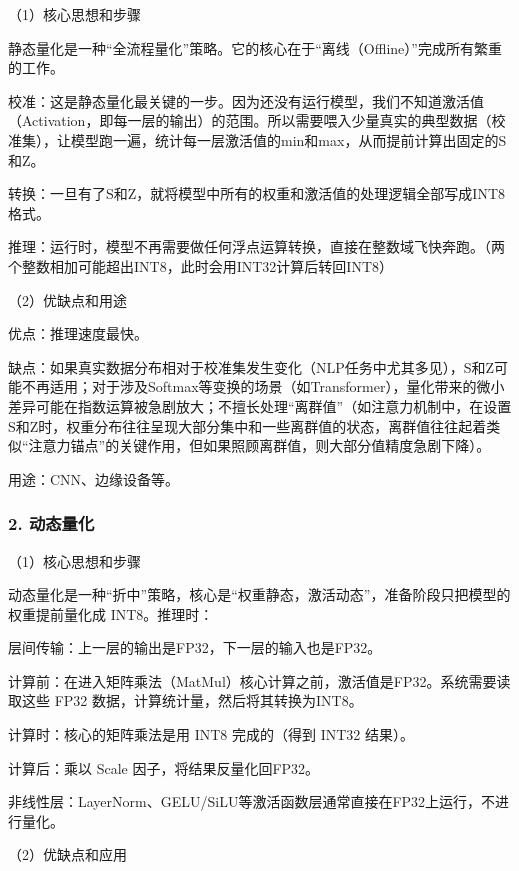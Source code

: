 （1）核心思想和步骤

静态量化是一种``全流程量化''策略。它的核心在于``离线（Offline）''完成所有繁重的工作。

校准：这是静态量化最关键的一步。因为还没有运行模型，我们不知道激活值（Activation，即每一层的输出）的范围。所以需要喂入少量真实的典型数据（校准集），让模型跑一遍，统计每一层激活值的min和max，从而提前计算出固定的S和Z。

转换：一旦有了S和Z，就将模型中所有的权重和激活值的处理逻辑全部写成INT8格式。

推理：运行时，模型不再需要做任何浮点运算转换，直接在整数域飞快奔跑。（两个整数相加可能超出INT8，此时会用INT32计算后转回INT8）

（2）优缺点和用途

优点：推理速度最快。

缺点：如果真实数据分布相对于校准集发生变化（NLP任务中尤其多见），S和Z可能不再适用；对于涉及Softmax等变换的场景（如Transformer），量化带来的微小差异可能在指数运算被急剧放大；不擅长处理``离群值''（如注意力机制中，在设置S和Z时，权重分布往往呈现大部分集中和一些离群值的状态，离群值往往起着类似``注意力锚点''的关键作用，但如果照顾离群值，则大部分值精度急剧下降）。

用途：CNN、边缘设备等。

\hypertarget{ux52a8ux6001ux91cfux5316}{%
\subsubsection{2. 动态量化}\label{ux52a8ux6001ux91cfux5316}}

（1）核心思想和步骤

动态量化是一种``折中''策略，核心是``权重静态，激活动态''，准备阶段只把模型的权重提前量化成 INT8。推理时：

层间传输：上一层的输出是FP32，下一层的输入也是FP32。

计算前：在进入矩阵乘法（MatMul）核心计算之前，激活值是FP32。系统需要读取这些 FP32 数据，计算统计量，然后将其转换为INT8。

计算时：核心的矩阵乘法是用 INT8 完成的（得到 INT32 结果）。

计算后：乘以 Scale 因子，将结果反量化回FP32。

非线性层：LayerNorm、GELU/SiLU等激活函数层通常直接在FP32上运行，不进行量化。

（2）优缺点和应用

